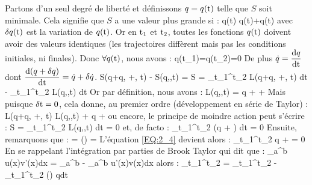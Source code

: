 Partons d'un seul degr\'e de libert\'e et d\'efinissons $q=q({\rm t})$ telle que $S$ soit minimale. Cela signifie que $S$ a une valeur plus grande si :
\be
	q({\rm t}) \rightarrow q({\rm t})+\delta q({\rm t}) \label{EQ:2_2}
\ee
avec $\delta q({\rm t})$ est la variation de $q({\rm t})$. Or en ${\rm t}_{1}$ et ${\rm t}_{2}$, toutes les fonctions $q({\rm t})$ doivent avoir des valeurs identiques (les trajectoires diff\`erent mais pas les conditions initiales, ni finales). Donc $\forall q({\rm t})$, nous avons :
\be
	\delta q({\rm t}_{1})=\delta q({\rm t}_{2})=0 \label{EQ:2_3}
\ee
De plus $\dot{q}=\dfrac{{\rm d}q}{\rm dt}$ dont $\dfrac{{\rm d}(q+\delta q)}{\rm dt}=\dot{q}+\delta\dot{q}$.
\be
	S(q+\delta q, +\delta {}, {\rm t}) - S(q,,{\rm t}) = \delta S = \int_{{\rm t}_{1}}^{{\rm t}_{2}} L(q+\delta q, +\delta {}, {\rm t}) d{\rm t} - \int_{{\rm t}_{1}}^{{\rm t}_{2}} L(q,,{\rm t}) d{\rm t}
\ee
Or par d\'efinition, nous avons :
\be
	\delta L(q,,{\rm t}) = \delta q + \delta {} + 
\ee
Mais puisque $\delta {\rm t}=0$, cela donne, au premier ordre (développement en s\'erie de Taylor) :
\be
	L(q+\delta q, +\delta {}, {\rm t}) \approx L(q,,{\rm t}) + \delta q + \delta {}
\ee
ou encore, le principe de moindre action peut s'\'ecrire :
\be
	\delta S = \delta \int_{{\rm t}_{1}}^{{\rm t}_{2}} L(q,,{\rm t}) d{\rm t} = 0 \label{EQ:2_4}
\ee
et, de facto :
\be
	\int_{{\rm t}_{1}}^{{\rm t}_{2}} \left(\delta q + \delta {}\right) {\rm dt} = 0
\ee
Ensuite, remarquons que :
\be
	\delta {} = \delta\left(\right) = 
\ee
L'\'equation \ref{EQ:2_4} devient alors :
\be
	\int_{{\rm t}_{1}}^{{\rm t}_{2}} \delta q +   = 0
\ee
En se rappelant l'intégration par parties de Brook Taylor qui dit que :
\be
	\int_{a}^{b} u(x)v'(x){\rm dx} = \left[u(x)v(x)\right]_{a}^{b} - \int_{a}^{b} u'(x)v(x){\rm dx}
\ee
alors :
\be
	\int_{{\rm t}_{1}}^{{\rm t}_{2}}   = _{{\rm t}_{1}}^{{\rm t}_{2}} - \int_{{\rm t}_{1}}^{{\rm t}_{2}} \left(\right) \delta q{\rm dt}
